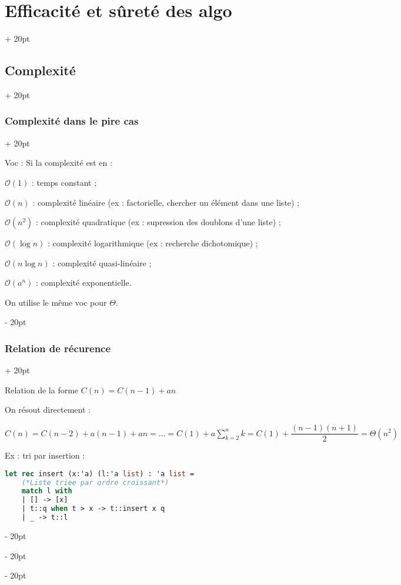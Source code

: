 \documentclass[a4paper, 12pt, twoside]{article}
\newcommand{\ind}[1][20pt]{\advance\leftskip + #1}
\newcommand{\deind}[1][20pt]{\advance\leftskip - #1}
\newenvironment{indentedenv}[1][20pt]{\par \ind[#1]}{\par \deind}
\newenvironment{indt}[2][20pt]{#2 \begin{indentedenv}[#1]}{\end{indentedenv}} %
\begin{document}
\begin{indt}{\section{Efficacité et sûreté des algo}}
\begin{indt}{\subsection{Complexité}}
            \begin{indt}{\subsubsection{Complexité dans le pire cas}}
                
                Voc : Si la complexité est en :
                
                $\mathcal{O}(1)$ : temps constant ;
                
                $\mathcal{O}(n)$ : complexité linéaire (ex : factorielle, chercher un élément dans une liste) ;
                
                $\mathcal{O}(n^2)$ : complexité quadratique (ex : supression des doublons d'une liste) ;
                
                $\mathcal{O}(\log n)$ : complexité logarithmique (ex : recherche dichotomique) ;
                
                $\mathcal{O}(n\log n)$ : complexité quasi-linéaire ;
                
                $\mathcal{O}(a^n)$ : complexité exponentielle.
                
                On utilise le même voc pour $\Theta$.
                
            \end{indt}
            
            \vspace{12pt}
            
            \begin{indt}{\subsubsection{Relation de récurence}}
                
                Relation de la forme $C(n) = C(n - 1) + an$
                
                On résout directement :
                
                $\displaystyle C(n) = C(n - 2) + a(n - 1) + an = ... = C(1) + a \sum_{k = 2}^n k = C(1) + \dfrac{(n - 1)(n + 1)}{2} = \Theta(n^2)$
                
                Ex : tri par insertion :
                
                \begin{lstlisting}[language=Caml, xleftmargin=80pt]
let rec insert (x:'a) (l:'a list) : 'a list =
    (*Liste triee par ordre croissant*)
    match l with
    | [] -> [x]
    | t::q when t > x -> t::insert x q
    | _ -> t::l


\end{lstlisting}
\end{indt}
\end{indt}
\end{indt}
\end{document}

